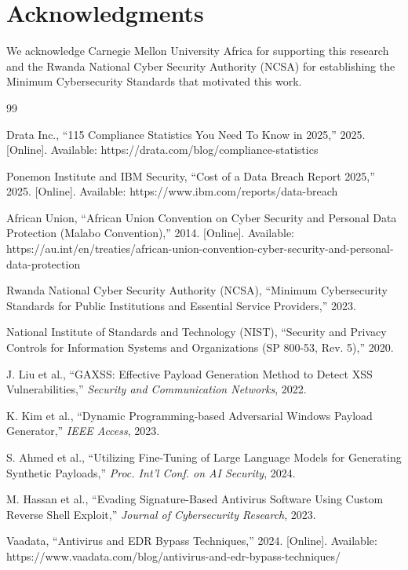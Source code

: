 \documentclass[11pt,conference]{IEEEtran}
\begin{document}
\section*{Acknowledgments}
We acknowledge Carnegie Mellon University Africa for supporting this research and the Rwanda National Cyber Security Authority (NCSA) for establishing the Minimum Cybersecurity Standards that motivated this work.


\begin{thebibliography}{99}

Drata Inc., ``115 Compliance Statistics You Need To Know in 2025,'' 2025. [Online]. Available: https://drata.com/blog/compliance-statistics

Ponemon Institute and IBM Security, ``Cost of a Data Breach Report 2025,'' 2025. [Online]. Available: https://www.ibm.com/reports/data-breach

African Union, ``African Union Convention on Cyber Security and Personal Data Protection (Malabo Convention),'' 2014. [Online]. Available: https://au.int/en/treaties/african-union-convention-cyber-security-and-personal-data-protection

Rwanda National Cyber Security Authority (NCSA), ``Minimum Cybersecurity Standards for Public Institutions and Essential Service Providers,'' 2023.

National Institute of Standards and Technology (NIST), ``Security and Privacy Controls for Information Systems and Organizations (SP 800-53, Rev. 5),'' 2020.

J. Liu et al., ``GAXSS: Effective Payload Generation Method to Detect XSS Vulnerabilities,'' \textit{Security and Communication Networks}, 2022.

K. Kim et al., ``Dynamic Programming-based Adversarial Windows Payload Generator,'' \textit{IEEE Access}, 2023.

S. Ahmed et al., ``Utilizing Fine-Tuning of Large Language Models for Generating Synthetic Payloads,'' \textit{Proc. Int'l Conf. on AI Security}, 2024.

M. Hassan et al., ``Evading Signature-Based Antivirus Software Using Custom Reverse Shell Exploit,'' \textit{Journal of Cybersecurity Research}, 2023.

Vaadata, ``Antivirus and EDR Bypass Techniques,'' 2024. [Online]. Available: https://www.vaadata.com/blog/antivirus-and-edr-bypass-techniques/


\end{thebibliography}
\end{document}
